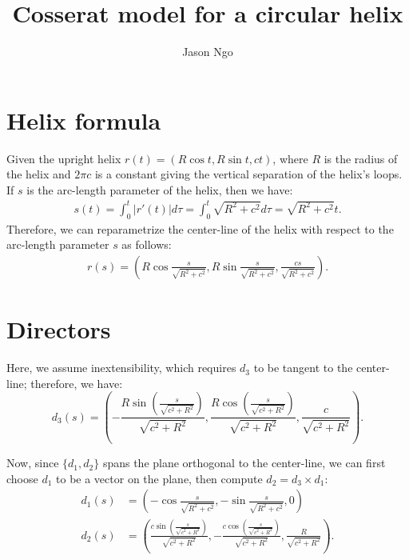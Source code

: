 \documentclass[11pt,letterpaper]{amsart}
\author{Jason Ngo}
\title{Cosserat model for a circular helix}
\begin{document}
\maketitle
\section{Helix formula}
Given the upright helix $ r(t) = \left(R\cos t, R \sin t, c t\right) $, where $ R $ is the radius of the helix and $ 2\pi c $ is a constant giving the vertical separation of the helix's loops. If $ s $ is the arc-length parameter of the helix, then we have:
\begin{align*}
	s(t) = \int_0^t |r'(t)| d\tau = \int_0^t \sqrt{R^2+c^2} d\tau = \sqrt{R^2+c^2} t.
\end{align*}
Therefore, we can reparametrize the center-line of the helix with respect to the arc-length parameter $ s $ as follows:
\begin{align}\label{eq:r(s)}
	r(s) = \left(R \cos{\frac{s}{\sqrt{R^2 + c^2}}}, R \sin{\frac{s}{\sqrt{R^2 + c^2}}}, \frac{cs}{\sqrt{R^2 + c^2}} \right).
\end{align}

\section{Directors}
Here, we assume inextensibility, which requires $ d_3 $ to be tangent to the center-line; therefore, we have:
\begin{equation}\label{eq:d3}
	d_3(s) = \left(-\frac{R \sin \left(\frac{s}{\sqrt{c^2+R^2}}\right)}{\sqrt{c^2+R^2}},\frac{R \cos \left(\frac{s}{\sqrt{c^2+R^2}}\right)}{\sqrt{c^2+R^2}},\frac{c}{\sqrt{c^2+R^2}}\right).
\end{equation}

Now, since $ \{ d_1, d_2 \} $ spans the plane orthogonal to the center-line, we can first choose $ d_1 $ to be a vector on the plane, then compute $ d_2 = d_3 \times d_1 $:
\begin{align}\label{eq:d12}
	d_1(s) &= \left(-\cos{\frac{s}{\sqrt{R^2 + c^2}}}, -\sin{\frac{s}{\sqrt{R^2 + c^2}}}, 0 \right) \\
	d_2(s) &= \left(\frac{c \sin \left(\frac{s}{\sqrt{c^2+R^2}}\right)}{\sqrt{c^2+R^2}},-\frac{c \cos \left(\frac{s}{\sqrt{c^2+R^2}}\right)}{\sqrt{c^2+R^2}},\frac{R}{\sqrt{c^2+R^2}}\right).
\end{align} 
\end{document}
